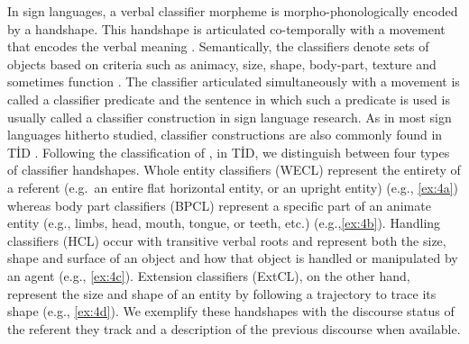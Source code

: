 \documentclass[review]{elsarticle} %
\begin{document}
In sign languages, a verbal classifier morpheme is morpho-phonologically
encoded by a handshape. This handshape is articulated co-temporally with
a movement that encodes the verbal meaning
\citep{supalla1990, benedicto2004}. Semantically, the classifiers denote
sets of objects based on criteria such as animacy, size, shape,
body-part, texture and sometimes function \citep{talmy2003}. The
classifier articulated simultaneously with a movement is called a
classifier predicate and the sentence in which such a predicate is used
is usually called a classifier construction in sign language research.
As in most sign languages hitherto studied, classifier constructions are
also commonly found in TİD \citep[see][ for a review]{dikyuva2015}.
Following the classification of \citep{engberg-pedersen1993}, in TİD, we
distinguish between four types of classifier handshapes. Whole entity
classifiers (WECL) represent the entirety of a referent (e.g.~an entire
flat horizontal entity, or an upright entity) (e.g., \ref{ex:4a})
whereas body part classifiers (BPCL) represent a specific part of an
animate entity (e.g., limbs, head, mouth, tongue, or teeth, etc.)
(e.g.,\ref{ex:4b}). Handling classifiers (HCL) occur with transitive
verbal roots and represent both the size, shape and surface of an object
and how that object is handled or manipulated by an agent (e.g.,
\ref{ex:4c}). Extension classifiers (ExtCL), on the other hand,
represent the size and shape of an entity by following a trajectory to
trace its shape (e.g., \ref{ex:4d}). We exemplify these handshapes with
the discourse status of the referent they track and a description of the
previous discourse when available.
\end{document}
